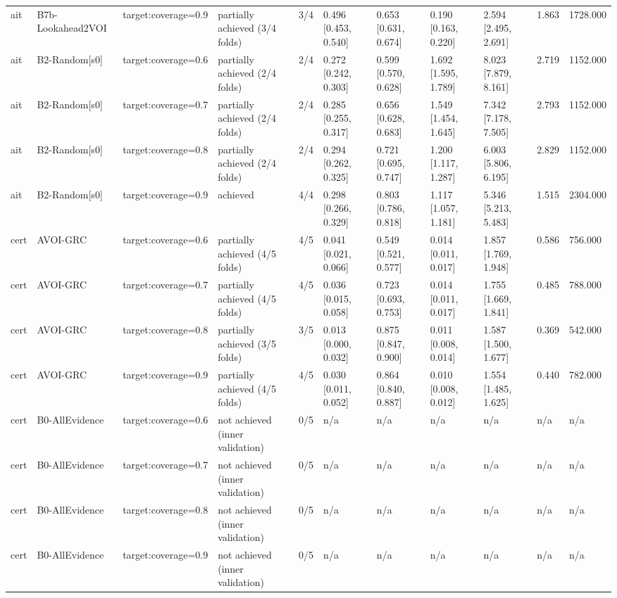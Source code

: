 \begin{table}[!ht]
{\begin{tabular}{lllllllllll}
ait & B7b-Lookahead2VOI & target:coverage=0.9 & partially achieved (3/4 folds) & 3/4 & 0.496 [0.453, 0.540] & 0.653 [0.631, 0.674] & 0.190 [0.163, 0.220] & 2.594 [2.495, 2.691] & 1.863 & 1728.000 \\
ait & B2-Random[s0] & target:coverage=0.6 & partially achieved (2/4 folds) & 2/4 & 0.272 [0.242, 0.303] & 0.599 [0.570, 0.628] & 1.692 [1.595, 1.789] & 8.023 [7.879, 8.161] & 2.719 & 1152.000 \\
ait & B2-Random[s0] & target:coverage=0.7 & partially achieved (2/4 folds) & 2/4 & 0.285 [0.255, 0.317] & 0.656 [0.628, 0.683] & 1.549 [1.454, 1.645] & 7.342 [7.178, 7.505] & 2.793 & 1152.000 \\
ait & B2-Random[s0] & target:coverage=0.8 & partially achieved (2/4 folds) & 2/4 & 0.294 [0.262, 0.325] & 0.721 [0.695, 0.747] & 1.200 [1.117, 1.287] & 6.003 [5.806, 6.195] & 2.829 & 1152.000 \\
ait & B2-Random[s0] & target:coverage=0.9 & achieved & 4/4 & 0.298 [0.266, 0.329] & 0.803 [0.786, 0.818] & 1.117 [1.057, 1.181] & 5.346 [5.213, 5.483] & 1.515 & 2304.000 \\
cert & AVOI-GRC & target:coverage=0.6 & partially achieved (4/5 folds) & 4/5 & 0.041 [0.021, 0.066] & 0.549 [0.521, 0.577] & 0.014 [0.011, 0.017] & 1.857 [1.769, 1.948] & 0.586 & 756.000 \\
cert & AVOI-GRC & target:coverage=0.7 & partially achieved (4/5 folds) & 4/5 & 0.036 [0.015, 0.058] & 0.723 [0.693, 0.753] & 0.014 [0.011, 0.017] & 1.755 [1.669, 1.841] & 0.485 & 788.000 \\
cert & AVOI-GRC & target:coverage=0.8 & partially achieved (3/5 folds) & 3/5 & 0.013 [0.000, 0.032] & 0.875 [0.847, 0.900] & 0.011 [0.008, 0.014] & 1.587 [1.500, 1.677] & 0.369 & 542.000 \\
cert & AVOI-GRC & target:coverage=0.9 & partially achieved (4/5 folds) & 4/5 & 0.030 [0.011, 0.052] & 0.864 [0.840, 0.887] & 0.010 [0.008, 0.012] & 1.554 [1.485, 1.625] & 0.440 & 782.000 \\
cert & B0-AllEvidence & target:coverage=0.6 & not achieved (inner validation) & 0/5 & n/a & n/a & n/a & n/a & n/a & n/a \\
cert & B0-AllEvidence & target:coverage=0.7 & not achieved (inner validation) & 0/5 & n/a & n/a & n/a & n/a & n/a & n/a \\
cert & B0-AllEvidence & target:coverage=0.8 & not achieved (inner validation) & 0/5 & n/a & n/a & n/a & n/a & n/a & n/a \\
cert & B0-AllEvidence & target:coverage=0.9 & not achieved (inner validation) & 0/5 & n/a & n/a & n/a & n/a & n/a & n/a \\

\end{tabular}}
\end{table}
